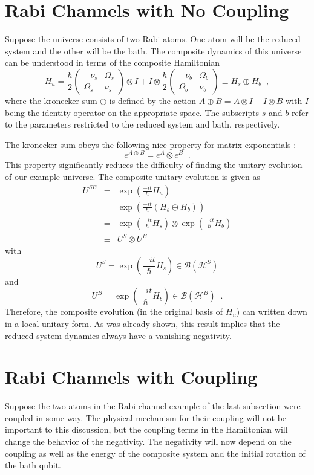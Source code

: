 \section{Rabi Channels with No Coupling}
\label{sec:rabinocoup}
Suppose the universe consists of two Rabi atoms.  One atom will be the reduced system and the other will be the bath.  The composite dynamics of this universe can be understood in terms of the composite Hamiltonian
$$
H_u = \frac{\hbar}{2}\begin{pmatrix}
-\nu_s & \Omega_s\\
\Omega_s & \nu_s
\end{pmatrix}\otimes I + I\otimes \frac{\hbar}{2}\begin{pmatrix}
-\nu_b & \Omega_b\\
\Omega_b & \nu_b
\end{pmatrix} \equiv H_s \oplus H_b\;\;,
$$
where the kronecker sum $\oplus$ is defined by the action $A\oplus B=A\otimes I+ I\otimes B$ with $I$ being the identity operator on the appropriate space.  The subscripts $s$ and $b$ refer to the parameters restricted to the reduced system and bath, respectively.

The kronecker sum obeys the following nice property for matrix exponentials \cite{Horn1990}:
$$
e^{A\oplus B} = e^A\otimes e^B\;\;.
$$
This property significantly reduces the difficulty of finding the unitary evolution of our example universe.  The composite unitary evolution is given as
\begin{eqnarray*}
U^{SB} &=& \exp\left(\frac{-it}{\hbar} H_u\right)\\
&=& \exp\left(\frac{-it}{\hbar} \left(H_s \oplus H_b\right)\right)\\
&=& \exp\left(\frac{-it}{\hbar} H_s \right) \otimes \exp\left(\frac{-it}{\hbar} H_b\right)\\
&\equiv & U^S\otimes U^B
\end{eqnarray*}
with
$$
U^S = \exp\left(\frac{-it}{\hbar} H_s \right) \in\mathcal{B}\left(\mathcal{H}^S\right)
$$
and
$$
U^B = \exp\left(\frac{-it}{\hbar} H_b \right) \in\mathcal{B}\left(\mathcal{H}^B\right)\;\;.
$$
Therefore, the composite evolution (in the original basis of $H_u$) can written down in a local unitary form.  As was already shown, this result implies that the reduced system dynamics always have a vanishing negativity.

\section{Rabi Channels with Coupling}
\label{sec:rabisub}
Suppose the two atoms in the Rabi channel example of the last subsection were coupled in some way.  The physical mechanism for their coupling will not be important to this discussion, but the coupling terms in the Hamiltonian will change the behavior of the negativity.  The negativity will now depend on the coupling as well as the energy of the composite system and the initial rotation of the bath qubit.

